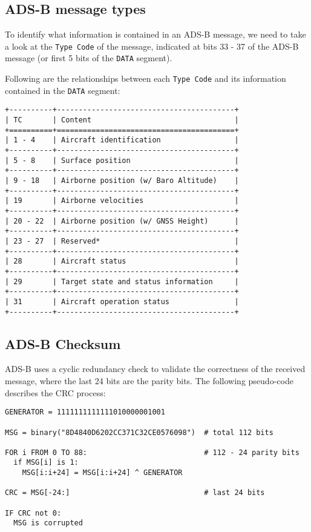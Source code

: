 \subsection{ADS-B message types}\label{ads-b-message-types}

To identify what information is contained in an ADS-B message, we need
to take a look at the \texttt{Type\ Code} of the message, indicated at
bits 33 - 37 of the ADS-B message (or first 5 bits of the \texttt{DATA}
segment).

Following are the relationships between each \texttt{Type\ Code} and its
information contained in the \texttt{DATA} segment:

\begin{verbatim}
+----------+-----------------------------------------+
| TC       | Content                                 |
+==========+=========================================+
| 1 - 4    | Aircraft identification                 |
+----------+-----------------------------------------+
| 5 - 8    | Surface position                        |
+----------+-----------------------------------------+
| 9 - 18   | Airborne position (w/ Baro Altitude)    |
+----------+-----------------------------------------+
| 19       | Airborne velocities                     |
+----------+-----------------------------------------+
| 20 - 22  | Airborne position (w/ GNSS Height)      |
+----------+-----------------------------------------+
| 23 - 27  | Reserved*                               |
+----------+-----------------------------------------+
| 28       | Aircraft status                         |
+----------+-----------------------------------------+
| 29       | Target state and status information     |
+----------+-----------------------------------------+
| 31       | Aircraft operation status               |
+----------+-----------------------------------------+
\end{verbatim}


\subsection{ADS-B Checksum}\label{ads-b-checksum}

ADS-B uses a cyclic redundancy check to validate the correctness of the
received message, where the last 24 bits are the parity bits. The
following pseudo-code describes the CRC process:

\begin{verbatim}
GENERATOR = 1111111111111010000001001

MSG = binary("8D4840D6202CC371C32CE0576098")  # total 112 bits

FOR i FROM 0 TO 88:                           # 112 - 24 parity bits
  if MSG[i] is 1:
    MSG[i:i+24] = MSG[i:i+24] ^ GENERATOR

CRC = MSG[-24:]                               # last 24 bits

IF CRC not 0:
  MSG is corrupted

\end{verbatim}

